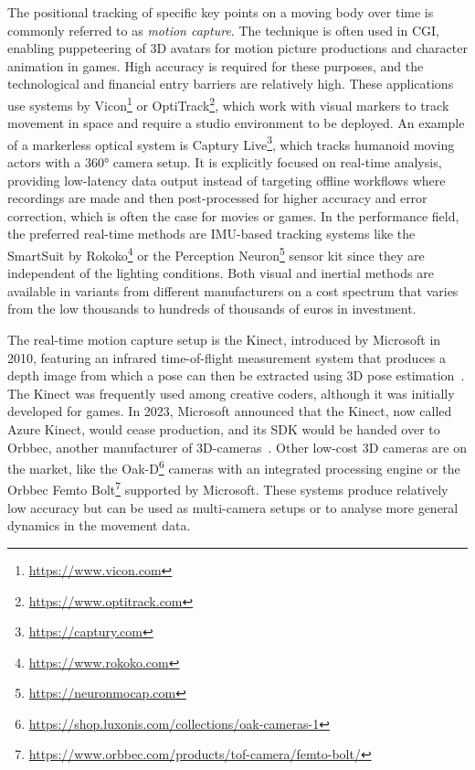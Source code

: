 The positional tracking of specific key points on a moving body over time is commonly referred to as \emph{motion capture}.
The technique is often used in \ac{CGI}, enabling puppeteering of \ac{3D} avatars for motion picture productions and character animation in games.
High accuracy is required for these purposes, and the technological and financial entry barriers are relatively high.
These applications use systems by Vicon\footnote{\url{https://www.vicon.com}} or OptiTrack\footnote{\url{https://www.optitrack.com}}, which work with visual markers to track movement in space and require a studio environment to be deployed.
An example of a markerless optical system is Captury Live\footnote{\url{https://captury.com}}, which tracks humanoid moving actors with a 360° camera setup.
It is explicitly focused on real-time analysis, providing low-latency data output instead of targeting offline workflows where recordings are made and then post-processed for higher accuracy and error correction, which is often the case for movies or games.
In the performance field, the preferred real-time methods are \ac{IMU}-based tracking systems like the SmartSuit by Rokoko\footnote{\url{https://www.rokoko.com}} or the Perception Neuron\footnote{\url{https://neuronmocap.com}} sensor kit since they are independent of the lighting conditions.
Both visual and inertial methods are available in variants from different manufacturers on a cost spectrum that varies from the low thousands to hundreds of thousands of euros in investment.

The  real-time motion capture setup is the Kinect, introduced by Microsoft in 2010, featuring an infrared time-of-flight measurement system that produces a depth image from which a pose can then be extracted using \ac{3D} pose estimation~\parencite[see][]{poseEstimationPaper}.
The Kinect was frequently used among creative coders, although it was initially developed for games.
In 2023, Microsoft announced that the Kinect, now called Azure Kinect, would cease production, and its \ac{SDK} would be handed over to Orbbec, another manufacturer of \ac{3D}-cameras~\parencite{kinectDiscontinued}.
Other low-cost 3D cameras are on the market, like the Oak-D\footnote{\url{https://shop.luxonis.com/collections/oak-cameras-1}} cameras with an integrated processing engine or the Orbbec Femto Bolt\footnote{\url{https://www.orbbec.com/products/tof-camera/femto-bolt/}} supported by Microsoft.
These systems produce relatively low accuracy but can be used as multi-camera setups or to analyse more general dynamics in the movement data.

